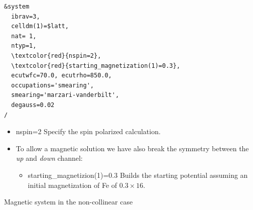 \documentclass[landscape]{foils}
\begin{document}
\begin{minipage}{11cm}
 \small{
 \begin{Verbatim}[frame=single, commandchars=\\\{\}]
&system
  ibrav=3, 
  celldm(1)=$latt, 
  nat= 1, 
  ntyp=1,
  \textcolor{red}{nspin=2},  
  \textcolor{red}{starting_magnetization(1)=0.3},
  ecutwfc=70.0, ecutrho=850.0,
  occupations='smearing', 
  smearing='marzari-vanderbilt', 
  degauss=0.02
/
 \end{Verbatim}
 }
\end{minipage}\hspace{1em}
\parbox{12cm}{
  \begin{itemize}
    \item {\ttfamily \small nspin=2} Specify  the spin polarized calculation.
    \item To allow a magnetic solution we have also break the symmetry between the \emph{up} 
      and \emph{down} channel:
      \begin{itemize} 
        \item {\ttfamily \small starting\_magnetizion(1)=0.3} Builds the starting potential assuming 
          an initial  magnetization of Fe of $0.3 \times 16$.
      \end{itemize}
    \end{itemize}
}
Magnetic system in the non-collinear case 
\end{document}
